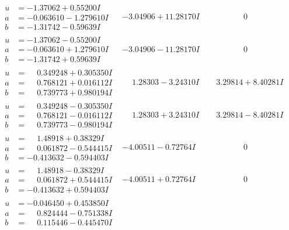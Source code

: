 \documentclass[1p]{elsarticle_modified}
\theoremstyle{definition}
\begin{document}
$$\begin{array}{c|c|c}
\begin{aligned}
u &= -1.37062 + 0.55200 I \\
a &= -0.063610 - 1.279610 I \\
b &= -1.31742 - 0.59639 I\end{aligned}
 & -3.04906 + 11.28170 I & \phantom{-0.000000 } 0 \\ \hline\begin{aligned}
u &= -1.37062 - 0.55200 I \\
a &= -0.063610 + 1.279610 I \\
b &= -1.31742 + 0.59639 I\end{aligned}
 & -3.04906 - 11.28170 I & \phantom{-0.000000 } 0 \\ \hline\begin{aligned}
u &= \phantom{-}0.349248 + 0.305350 I \\
a &= \phantom{-}0.768121 + 0.016112 I \\
b &= \phantom{-}0.739773 + 0.980194 I\end{aligned}
 & \phantom{-}1.28303 - 3.24310 I & \phantom{-}3.29814 + 8.40281 I \\ \hline\begin{aligned}
u &= \phantom{-}0.349248 - 0.305350 I \\
a &= \phantom{-}0.768121 - 0.016112 I \\
b &= \phantom{-}0.739773 - 0.980194 I\end{aligned}
 & \phantom{-}1.28303 + 3.24310 I & \phantom{-}3.29814 - 8.40281 I \\ \hline\begin{aligned}
u &= \phantom{-}1.48918 + 0.38329 I \\
a &= \phantom{-}0.061872 - 0.544415 I \\
b &= -0.413632 - 0.594403 I\end{aligned}
 & -4.00511 - 0.72764 I & \phantom{-0.000000 } 0 \\ \hline\begin{aligned}
u &= \phantom{-}1.48918 - 0.38329 I \\
a &= \phantom{-}0.061872 + 0.544415 I \\
b &= -0.413632 + 0.594403 I\end{aligned}
 & -4.00511 + 0.72764 I & \phantom{-0.000000 } 0 \\ \hline\begin{aligned}
u &= -0.046450 + 0.453850 I \\
a &= \phantom{-}0.824444 - 0.751338 I \\
b &= \phantom{-}0.115446 - 0.445470 I\end{aligned}

\end{array}$$
\end{document}
